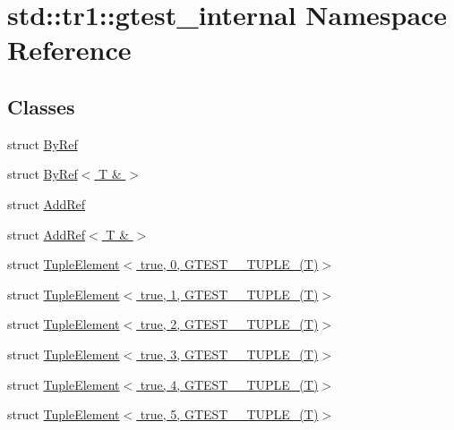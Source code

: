 \hypertarget{namespacestd_1_1tr1_1_1gtest__internal}{\section{std\-:\-:tr1\-:\-:gtest\-\_\-internal \-Namespace \-Reference}
\label{d7/d34/namespacestd_1_1tr1_1_1gtest__internal}
}
\subsection*{\-Classes}
\begin{DoxyCompactItemize}
\item 
struct \hyperlink{structstd_1_1tr1_1_1gtest__internal_1_1ByRef}{\-By\-Ref}
\item 
struct \hyperlink{structstd_1_1tr1_1_1gtest__internal_1_1ByRef_3_01T_01_6_01_4}{\-By\-Ref$<$ T \& $>$}
\item 
struct \hyperlink{structstd_1_1tr1_1_1gtest__internal_1_1AddRef}{\-Add\-Ref}
\item 
struct \hyperlink{structstd_1_1tr1_1_1gtest__internal_1_1AddRef_3_01T_01_6_01_4}{\-Add\-Ref$<$ T \& $>$}
\item 
struct \hyperlink{structstd_1_1tr1_1_1gtest__internal_1_1TupleElement_3_01true_00_010_00_01GTEST__10__TUPLE___07T_08_4}{\-Tuple\-Element$<$ true, 0, G\-T\-E\-S\-T\-\_\-\_\-\-T\-U\-P\-L\-E\-\_\-(\-T)$>$}
\item 
struct \hyperlink{structstd_1_1tr1_1_1gtest__internal_1_1TupleElement_3_01true_00_011_00_01GTEST__10__TUPLE___07T_08_4}{\-Tuple\-Element$<$ true, 1, G\-T\-E\-S\-T\-\_\-\_\-\-T\-U\-P\-L\-E\-\_\-(\-T)$>$}
\item 
struct \hyperlink{structstd_1_1tr1_1_1gtest__internal_1_1TupleElement_3_01true_00_012_00_01GTEST__10__TUPLE___07T_08_4}{\-Tuple\-Element$<$ true, 2, G\-T\-E\-S\-T\-\_\-\_\-\-T\-U\-P\-L\-E\-\_\-(\-T)$>$}
\item 
struct \hyperlink{structstd_1_1tr1_1_1gtest__internal_1_1TupleElement_3_01true_00_013_00_01GTEST__10__TUPLE___07T_08_4}{\-Tuple\-Element$<$ true, 3, G\-T\-E\-S\-T\-\_\-\_\-\-T\-U\-P\-L\-E\-\_\-(\-T)$>$}
\item 
struct \hyperlink{structstd_1_1tr1_1_1gtest__internal_1_1TupleElement_3_01true_00_014_00_01GTEST__10__TUPLE___07T_08_4}{\-Tuple\-Element$<$ true, 4, G\-T\-E\-S\-T\-\_\-\_\-\-T\-U\-P\-L\-E\-\_\-(\-T)$>$}
\item 
struct \hyperlink{structstd_1_1tr1_1_1gtest__internal_1_1TupleElement_3_01true_00_015_00_01GTEST__10__TUPLE___07T_08_4}{\-Tuple\-Element$<$ true, 5, G\-T\-E\-S\-T\-\_\-\_\-\-T\-U\-P\-L\-E\-\_\-(\-T)$>$}

\end{DoxyCompactItemize}

